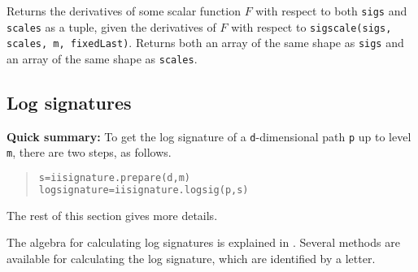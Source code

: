 \documentclass[a4paper]{extarticle}
\newenvironment{defn}{\begin{adjustwidth}{1cm}{}\ignorespaces}{\end{adjustwidth}\ignorespacesafterend}
\begin{document}
\begin{defn}
	\nopagebreak Returns the derivatives of some scalar function $F$ with respect to both \verb|sigs| and \verb|scales| as a tuple, given %
	the derivatives of $F$ with respect to \verb!sigscale(sigs, scales, m, fixedLast)!. Returns both an array of the same shape as \verb|sigs| and an array of the same shape as \verb|scales|. 
\end{defn}
\iffalse
\verb!sigjoinbackprop1(sigs, segments, m, derivs)!\i{sigjoinbackprop1}

\begin{defn}
\nopagebreak Returns the derivatives of $F$ with respect to \verb|sigs| as an array of shape \verb|(n,siglength(d,m))| given that \verb|derivs| is the derivatives of $F$ with respect to \verb!sigjoin(sigs, segments, m)!.
\end{defn}
\verb!sigjoinbackprop2(sigs, segments, m, derivs)!\i{sigjoinbackprop2}

\begin{defn}
\nopagebreak Returns the derivatives of $F$ with respect to \verb|segments| as an array of shape \verb|(n, d))| given that \verb|derivs| is the derivatives of $F$ with respect to \verb!sigjoin(sigs, segments, m)!.
\end{defn}
\fi
\newpage
\subsection{Log signatures}
\begin{center}
\begin{minipage}{0.7\textwidth}
\noindent\textbf{Quick summary:} To get the log signature of a \verb!d!-dimensional path \verb!p! up to level \verb!m!, there are two steps, as follows.
\begin{quotation}
\begin{lstlisting}[language=Python,keywordstyle=\bf]
s=iisignature.prepare(d,m)
logsignature=iisignature.logsig(p,s)
\end{lstlisting}
\end{quotation}
The rest of this section gives more details.
\end{minipage}
\end{center}
The algebra for calculating log signatures is explained in \cite{LOGSIG}. Several methods are available for calculating the log signature, which are identified by a letter.
\end{document}
